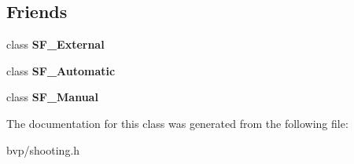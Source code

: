 \subsection*{Friends}
\begin{DoxyCompactItemize}
\item 
\mbox{\label{classShootingFunction_a93dbf39ac4cbbc98d7d42b86d98179eb}} 
class {\bfseries S\+F\+\_\+\+External}
\item 
\mbox{\label{classShootingFunction_ab9857bb910ee9206e4888bdc358f0ecb}} 
class {\bfseries S\+F\+\_\+\+Automatic}
\item 
\mbox{\label{classShootingFunction_acf7e9fe888f96c8f5b3243c0848c0fcd}} 
class {\bfseries S\+F\+\_\+\+Manual}
\end{DoxyCompactItemize}


The documentation for this class was generated from the following file\+:\begin{DoxyCompactItemize}
\item 
bvp/shooting.\+h\end{DoxyCompactItemize}
